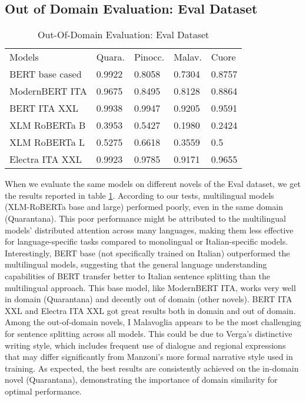 \documentclass[11pt]{article}
\begin{document}
\subsection{Out of Domain Evaluation: Eval Dataset}

\begin{table}[]
	\small
	\caption{Out-Of-Domain Evaluation: Eval Dataset}
	\begin{tabular}{lllll}
		Models & Quara. & Pinocc. & Malav. & Cuore \\
		BERT base cased & 0.9922      & 0.8058 & 0.7304        & 0.8757                  \\
		ModernBERT ITA  & 0.9675     & 0.8495   & 0.8128   & 0.8864                  \\
		BERT ITA XXL  & 0.9938      & 0.9947   & 0.9205     & 0.9591                 \\
		XLM RoBERTa B & 0.3953       & 0.5427   & 0.1980     & 0.2424                 \\
		XLM RoBERTa L & 0.5275       & 0.6618    & 0.3559   & 0.5               \\
		Electra ITA XXL  & 0.9923       & 0.9785    & 0.9171    & 0.9655             
	\end{tabular}
	\label{t2}
\end{table}
When we evaluate the same models on different novels of the Eval dataset, we get the results reported in table \ref{t2}. \newline According to our tests, multilingual models (XLM-RoBERTa base and large) performed poorly, even in the same domain (Quarantana). \newline This poor performance might be attributed to the multilingual models' distributed attention across many languages, making them less effective for language-specific tasks compared to monolingual or Italian-specific models. \newline Interestingly, BERT base (not specifically trained on Italian) outperformed the multilingual models, suggesting that the general language understanding capabilities of BERT transfer better to Italian sentence splitting than the multilingual approach. \newline This base model, like ModernBERT ITA, works very well in domain (Quarantana) and decently out of domain (other novels). \newline BERT ITA XXL and Electra ITA XXL got great results both in domain and out of domain. \newline Among the out-of-domain novels, I Malavoglia appears to be the most challenging for sentence splitting across all models. \newline This could be due to Verga's distinctive writing style, which includes frequent use of dialogue and regional expressions that may differ significantly from Manzoni's more formal narrative style used in training. \newline As expected, the best results are consistently achieved on the in-domain novel (Quarantana), demonstrating the importance of domain similarity for optimal performance.
\end{document}
